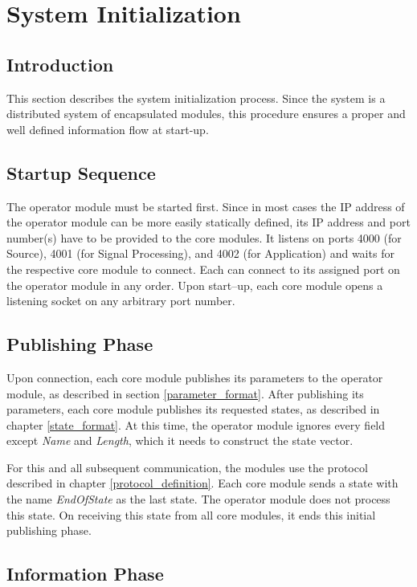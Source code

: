 \documentclass[letterpaper,oneside,12pt]{book}
\begin{document}
\section{System Initialization}
\label{system_init}

\subsection{Introduction}

This section describes the system initialization process. Since the system is a 
distributed system of encapsulated modules, this procedure ensures a proper and 
well defined information flow at start-up.

\subsection{Startup Sequence}

The operator module must be started first. Since in most cases the IP address of 
the operator module can be more easily statically defined, its IP address and 
port number(s) have to be provided to the core modules. It listens on ports 4000 
(for Source), 4001 (for Signal Processing), and 4002 (for Application) and 
waits for the respective core module to connect. Each can connect to its 
assigned port on the operator module in any order. Upon start--up, each core 
module opens a listening socket on any arbitrary port number.

\subsection{Publishing Phase}

Upon connection, each core module publishes its parameters to the operator 
module, as described in section \ref{parameter_format}. After publishing its 
parameters, each core module publishes its requested states, as described in 
chapter \ref{state_format}. At this time, the operator module ignores every 
field except \textit{Name} and \textit{Length}, which it needs to construct the 
state vector.

For this and all subsequent communication, the modules use the protocol 
described in chapter \ref{protocol_definition}. Each core module sends a state 
with the name \textit{EndOfState} as the last state. The operator module does 
not process this state. On receiving this state from all core modules, it ends 
this initial publishing phase.

\subsection{Information Phase}
\end{document}

